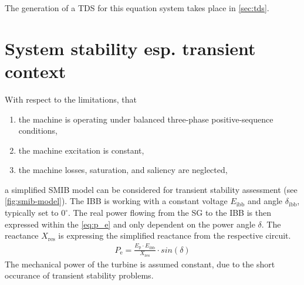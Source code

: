 The generation of a \ac{TDS} for this equation system takes place in \autoref{sec:tds}.

\section{System stability esp. transient context}

With respect to the limitations, that
\begin{enumerate}
        \item the machine is operating under balanced three-phase positive-sequence conditions,
        \item the machine excitation is constant, 
        \item the machine losses, saturation, and saliency are neglected,
\end{enumerate}
a simplified \acf{SMIB} model can be considered for transient stability assessment (see \autoref{fig:smib-model}).  The \ac{IBB} is working with a constant voltage $E_\mathrm{ibb}$ and angle $\delta_\mathrm{ibb}$, typically set to $0^\circ$. The real power flowing from the \ac{SG} to the \ac{IBB} is then expressed within the \autoref{eq:p_e} and only dependent on the power angle $\delta$. The reactance $X_\mathrm{res}$ is expressing the simplified reactance from the respective circuit.
\begin{align}
        P_\mathrm{e}=\frac{E_\mathrm{p} \cdot E_\mathrm{ibb}}{X_\mathrm{res}} \cdot sin(\delta) \label{eq:p_e}
\end{align}
The mechanical power of the turbine is assumed constant, due to the short occurance of transient stability problems.

